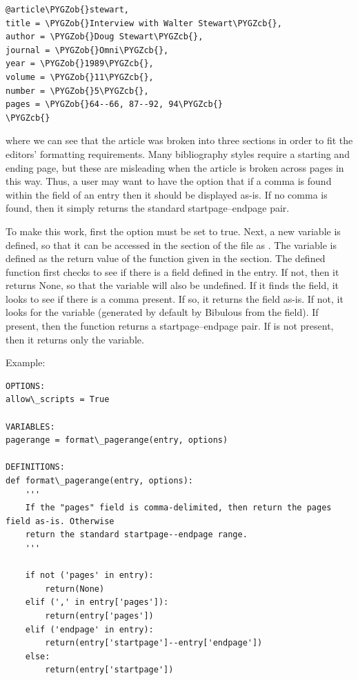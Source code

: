 \documentclass[letterpaper,10pt,english]{sphinxmanual}
\def\PYGZob{\char`\{}
\def\PYGZcb{\char`\}}
\begin{document}
\begin{Verbatim}[commandchars=\\\{\}]
@article\PYGZob{}stewart,
title = \PYGZob{}Interview with Walter Stewart\PYGZcb{},
author = \PYGZob{}Doug Stewart\PYGZcb{},
journal = \PYGZob{}Omni\PYGZcb{},
year = \PYGZob{}1989\PYGZcb{},
volume = \PYGZob{}11\PYGZcb{},
number = \PYGZob{}5\PYGZcb{},
pages = \PYGZob{}64--66, 87--92, 94\PYGZcb{}
\PYGZcb{}
\end{Verbatim}

where we can see that the article was broken into three sections in order to fit the editors' formatting requirements. Many bibliography styles require a starting and ending page, but these are misleading when the article is broken across pages in this way. Thus, a user may want to have the option that if a comma is found within the  field of an entry then it should be displayed as-is. If no comma is found, then it simply returns the standard startpage--endpage pair.

To make this work, first the option  must be set to true. Next, a new  variable is defined, so that it can be accessed in the  section of the file as . The variable is defined as the return value of the function  given in the  section. The defined function first checks to see if there is a  field defined in the entry. If not, then it returns None, so that the  variable will also be undefined. If it finds the  field, it looks to see if there is a comma present. If so, it returns the field as-is. If not, it looks for the  variable (generated by default by Bibulous from the  field). If present, then the function returns a startpage--endpage pair. If  is not present, then it returns only the  variable.

Example:

\begin{Verbatim}[commandchars=\\\{\}]
OPTIONS:
allow\_scripts = True

VARIABLES:
pagerange = format\_pagerange(entry, options)

DEFINITIONS:
def format\_pagerange(entry, options):
    '''
    If the "pages" field is comma-delimited, then return the pages field as-is. Otherwise
    return the standard startpage--endpage range.
    '''

    if not ('pages' in entry):
        return(None)
    elif (',' in entry['pages']):
        return(entry['pages'])
    elif ('endpage' in entry):
        return(entry['startpage']--entry['endpage'])
    else:
        return(entry['startpage'])
\end{Verbatim}
\end{document}
